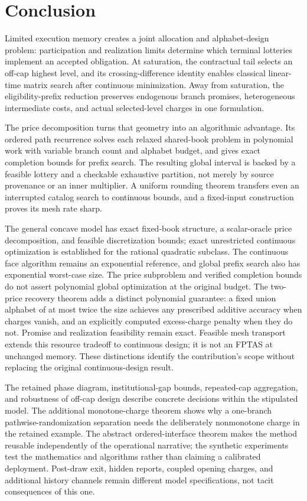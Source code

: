 \section{Conclusion}
Limited execution memory creates a joint allocation and alphabet-design problem: participation and realization limits determine which terminal lotteries implement an accepted obligation. At saturation, the contractual tail selects an off-cap highest level, and its crossing-difference identity enables classical linear-time matrix search after continuous minimization. Away from saturation, the eligibility-prefix reduction preserves endogenous branch promises, heterogeneous intermediate costs, and actual selected-level charges in one formulation.

The price decomposition turns that geometry into an algorithmic advantage. Its ordered path recurrence solves each relaxed shared-book problem in polynomial work with variable branch count and alphabet budget, and gives exact completion bounds for prefix search. The resulting global interval is backed by a feasible lottery and a checkable exhaustive partition, not merely by source provenance or an inner multiplier. A uniform rounding theorem transfers even an interrupted catalog search to continuous bounds, and a fixed-input construction proves its mesh rate sharp.

The general concave model has exact fixed-book structure, a scalar-oracle price decomposition, and feasible discretization bounds; exact unrestricted continuous optimization is established for the rational quadratic subclass. The continuous face algorithm remains an exponential reference, and global prefix search also has exponential worst-case size. The price subproblem and verified completion bounds do not assert polynomial global optimization at the original budget. The two-price recovery theorem adds a distinct polynomial guarantee: a fixed union alphabet of at most twice the size achieves any prescribed additive accuracy when charges vanish, and an explicitly computed excess-charge penalty when they do not. Promise and realization feasibility remain exact. Feasible mesh transport extends this resource tradeoff to continuous design; it is not an FPTAS at unchanged memory. These distinctions identify the contribution's scope without replacing the original continuous-design result.

The retained phase diagram, institutional-gap bounds, repeated-cap aggregation, and robustness of off-cap design describe concrete decisions within the stipulated model. The additional monotone-charge theorem shows why a one-branch pathwise-randomization separation needs the deliberately nonmonotone charge in the retained example. The abstract ordered-interface theorem makes the method reusable independently of the operational narrative; the synthetic experiments test the mathematics and algorithms rather than claiming a calibrated deployment. Post-draw exit, hidden reports, coupled opening charges, and additional history channels remain different model specifications, not tacit consequences of this one.
